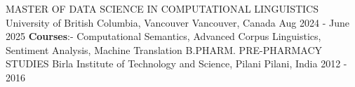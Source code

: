 

\begin{cventries}

  \cventry
  {MASTER OF DATA SCIENCE IN COMPUTATIONAL LINGUISTICS} %
  {University of British Columbia, Vancouver} %
  {Vancouver, Canada} %
  {Aug 2024 - June 2025} %
  {\textbf{Courses}:- Computational Semantics, Advanced Corpus Linguistics, 
  Sentiment Analysis, Machine Translation}
\vspace{1em}
\cventry
{B.PHARM. PRE-PHARMACY STUDIES} %
{Birla Institute of Technology and Science, Pilani} %
{Pilani, India} %
{2012 - 2016} %
{}
\end{cventries}
